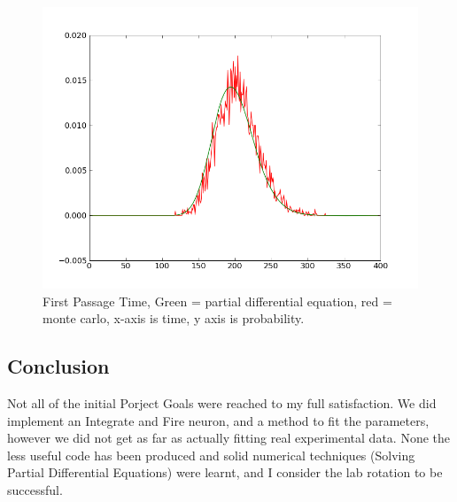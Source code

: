 \documentclass[10pt]{article}
\begin{document}
\begin{figure}[htp]
\centering
\includegraphics[scale=0.60]{fpt.png}
\caption{First Passage Time, Green = partial differential equation,
red = monte carlo, x-axis is time, y axis is probability. }
\end{figure}

\subsection{Conclusion}

Not all of the initial Porject Goals were reached to my full
satisfaction. We did implement an Integrate and Fire
neuron, and a method to fit the parameters, however we did not get as
far as actually fitting real experimental data. None the less 
useful code has been produced and solid numerical techniques (Solving
Partial Differential Equations) were
learnt, and I consider the lab rotation to be successful. 

{  }
\end{document}
